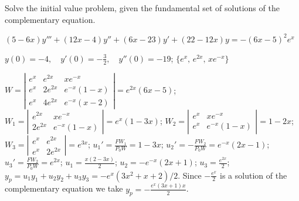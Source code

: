 \documentclass{ximera}
\begin{document}
\begin{problem}\label{exer:9.4.24}
Solve the
initial value problem, given the fundamental set of solutions of the complementary equation.

$(5-6x)y'''+(12x-4)y''+(6x-23)y'+(22-12x)y=-(6x-5)^2e^x$


$y(0)=-4, \quad  y'(0)=-\frac{3}{2},\quad y''(0)=-19$;\quad
 $\{e^x,\,e^{2x},\,xe^{-x} \}$

\begin{solution}
$W=\left|\begin{array}{cccc}
e^x&e^{2x}&xe^{-x}\\e^x&2e^{2x}&e^{-x}(1-x)\\e^x&4e^{2x}&e
^{-x}(x-2)\end{array}\right|=e^{2x}(6x-5)$;
$W_1=\left|\begin{array}{cccc}
e^{2x}&xe^{-x}\\2e^{2x}&e^{-x}(1-x)\end{array}\right|=e^x(1-3x)$;
$W_2=\left|\begin{array}{cccc}
e^x&xe^{-x}\\e^x&e^{-x}(1-x)\end{array}\right|=1-2x$;
$W_3=\left|\begin{array}{cccc}
e^x&e^{2x}\\e^x&2e^{2x}\end{array}\right|=e^{3x}$;
$u_1'=\frac{FW_1}{P_0W}=1-3x$;
$u_2'=-\frac{FW_2}{P_0W}=e^{-x}(2x-1)$;
$u_3'=\frac{FW_2}{P_0W}=e^{2x}$;
$u_1=\frac{x(2-3x)}{2}$;
$u_2=-e^{-x}(2x+1)$;
$u_3=\frac{e^{2x}}{2}$;
$y_p=u_1y_1+u_2y_2+u_3y_3=-e^x(3x^2+x+2)/2$. Since
$-\frac{e^x}{2}$ is a solution of the complementary equation
we take $y_p=-\frac{e^x(3x+1)x}{2}$.


\end{solution}
\end{problem}
\end{document}
